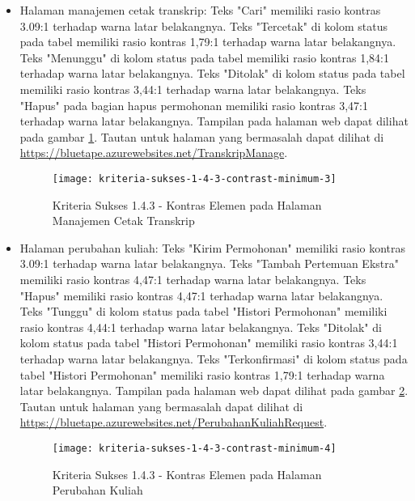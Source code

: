 \begin{itemize}
    \item Halaman manajemen cetak transkrip: Teks "Cari" memiliki rasio kontras 3.09:1 terhadap warna latar belakangnya. Teks "Tercetak" di kolom status pada tabel memiliki rasio kontras 1,79:1 terhadap warna latar belakangnya. Teks "Menunggu" di kolom status pada tabel memiliki rasio kontras 1,84:1 terhadap warna latar belakangnya. Teks "Ditolak" di kolom status pada tabel memiliki rasio kontras 3,44:1 terhadap warna latar belakangnya. Teks "Hapus" pada bagian hapus permohonan memiliki rasio kontras 3,47:1 terhadap warna latar belakangnya. Tampilan pada halaman web dapat dilihat pada gambar \ref{fig:1.4.3_contrast_minimum_3}. Tautan untuk halaman yang bermasalah dapat dilihat di \url{https://bluetape.azurewebsites.net/TranskripManage}.
    \begin{figure}[H]
        \centering  
        \texttt{[image: kriteria-sukses-1-4-3-contrast-minimum-3]}  
        \caption[Kriteria Sukses 1.4.3 - Kontras Elemen pada Halaman Manajemen Cetak Transkrip]{Kriteria Sukses 1.4.3 - Kontras Elemen pada Halaman Manajemen Cetak Transkrip}
        \label{fig:1.4.3_contrast_minimum_3}  
    \end{figure} 
    
    \item Halaman perubahan kuliah: Teks "Kirim Permohonan" memiliki rasio kontras 3.09:1 terhadap warna latar belakangnya. Teks "Tambah Pertemuan Ekstra" memiliki rasio kontras 4,47:1 terhadap warna latar belakangnya. Teks "Hapus" memiliki rasio kontras 4,47:1 terhadap warna latar belakangnya. Teks "Tunggu" di kolom status pada tabel "Histori Permohonan" memiliki rasio kontras 4,44:1 terhadap warna latar belakangnya. Teks "Ditolak" di kolom status pada tabel "Histori Permohonan" memiliki rasio kontras 3,44:1 terhadap warna latar belakangnya. Teks "Terkonfirmasi" di kolom status pada tabel "Histori Permohonan" memiliki rasio kontras 1,79:1 terhadap warna latar belakangnya. Tampilan pada halaman web dapat dilihat pada gambar \ref{fig:1.4.3_contrast_minimum_4}. Tautan untuk halaman yang bermasalah dapat dilihat di \url{https://bluetape.azurewebsites.net/PerubahanKuliahRequest}.
    \begin{figure}[H]
        \centering  
        \texttt{[image: kriteria-sukses-1-4-3-contrast-minimum-4]}  
        \caption[Kriteria Sukses 1.4.3 - Kontras Elemen pada Halaman Perubahan Kuliah]{Kriteria Sukses 1.4.3 - Kontras Elemen pada Halaman Perubahan Kuliah}
        \label{fig:1.4.3_contrast_minimum_4}  
    \end{figure} 
    

\end{itemize}
